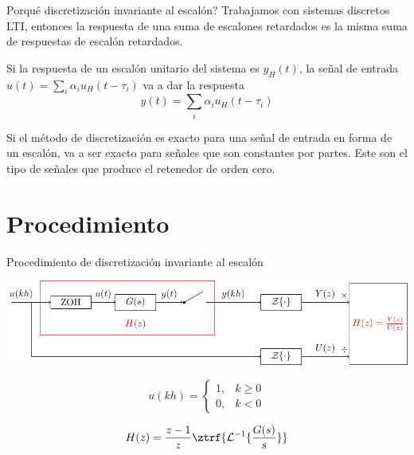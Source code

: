 \documentclass[presentation,aspectratio=169]{beamer}
\begin{document}
\begin{frame}[label={sec:orge09b4ad}]{Porqué discretización invariante al escalón?}
Trabajamos con sistemas discretos LTI, entonces la respuesta de una suma de escalones retardados es la misma suma de respuestas de escalón retardados.

\begin{center}
\end{center}
Si la respuesta de un escalón unitario del sistema es \(y_H(t)\), la señal de entrada  
\(u(t) = \sum_{i} \alpha_i u_H(t-\tau_i)\) va a dar la respuesta \[y(t)=\sum_{i} \alpha_i u_H(t-\tau_i)\]


\begin{tcolorbox}
   Si el método de discretización es exacto para una señal de entrada en forma de un escalón, va a ser exacto para señales que son constantes por partes. Este son el tipo de señales que produce el retenedor de orden cero. 
\end{tcolorbox}
\end{frame}



\section{Procedimiento}
\label{sec:orgf44ccd1}
\begin{frame}[label={sec:orge1c1fba}]{Procedimiento de discretización invariante al escalón}
\begin{center}
\includegraphics[width=0.99\linewidth]{../../figures/invariant-sampling.pdf}
\end{center}
\[ u(kh) = \begin{cases} 1, & k \ge 0\\0, & k<0 \end{cases} \]

\begin{tcolorbox}
\[ H(z) = \frac{z-1}{z} \ztrf{\mathcal{L}^{-1}\{ \frac{G(s)}{s} \}} \]
\end{tcolorbox}
\end{frame}
\end{document}
